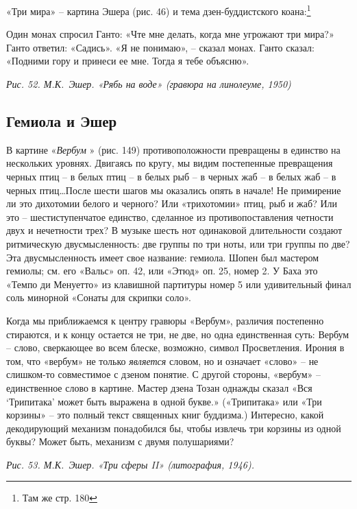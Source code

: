\documentclass[../main.tex]{subfiles}
\begin{document}
«Три мира» \--- картина Эшера (рис. 46) и тема дзен-буддистского коана:\footnote{Там же стр. 180}

\begin{koan}
    Один монах спросил Ганто: «Чте мне делать, когда мне угрожают три мира?» Ганто ответил: «Садись». «Я не понимаю», \--- сказал монах. Ганто сказал: «Подними гору и принеси ее мне. Тогда я тебе объясню».
\end{koan}

\emph{Рис. 52. М.К.~Эшер. «Рябь на воде» (гравюра на линолеуме, 1950)}


\subsection{Гемиола и Эшер}

В картине «\emph{Вербум} » (рис. 149) противоположности превращены в единство на нескольких уровнях. Двигаясь по кругу, мы видим постепенные превращения черных птиц \--- в белых птиц \--- в белых рыб \--- в черных жаб \--- в белых жаб \--- в черных птиц\ldots После шести шагов мы оказались опять в начале! Не примирение ли это дихотомии белого и черного? Или «трихотомии» птиц, рыб и жаб? Или это \--- шестиступенчатое единство, сделанное из противопоставления четности двух и нечетности трех? В музыке шесть нот одинаковой длительности создают ритмическую двусмысленность: две группы по три ноты, или три группы по две? Эта двусмысленность имеет свое название: гемиола. Шопен был мастером гемиолы; см. его «Вальс» оп. 42, или «Этюд» оп. 25, номер 2. У Баха это «Темпо ди Менуетто» из клавишной партитуры номер 5 или удивительный финал соль минорной «Сонаты для скрипки соло».

Когда мы приближаемся к центру гравюры «Вербум», различия постепенно стираются, и к концу остается не три, не две, но одна единственная суть: Вербум \--- слово, сверкающее во всем блеске, возможно, символ Просветления. Ирония в том, что «вербум» не только \emph{является} словом, но и означает «слово» \--- не слишком-то совместимое с дзеном понятие. С другой стороны, «вербум» \--- единственное слово в картине. Мастер дзена Тозан однажды сказал «Вся \enquote*{Трипитака} может быть выражена в одной букве.» («Трипитака» или «Три корзины» \--- это полный текст священных книг буддизма.) Интересно, какой декодирующий механизм понадобился бы, чтобы извлечь три корзины из одной буквы? Может быть, механизм с двумя полушариями?

\emph{Рис. 53. М.К.~Эшер. «Три сферы II» (литография, 1946).}
\end{document}
